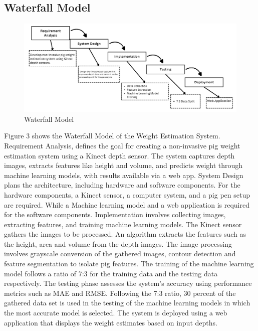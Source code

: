 {\subsection { Waterfall Model}
\begin{figure}[h]
	\centering
	\includegraphics[height=0.3\textheight]{figures/Requirement Analysis (4)}
	\caption{Waterfall Model}
	\label{fig:Waterfall Model}
\end{figure}

Figure 3 shows the Waterfall Model of the Weight Estimation System. Requirement Analysis, defines the goal for creating a non-invasive pig weight estimation system using a Kinect depth sensor. The system captures depth images, extracts features like height and volume, and predicts weight through machine learning models, with results available via a web app. System Design plans the architecture, including hardware and software components. For the hardware components, a Kinect sensor, a computer system, and a pig pen setup are required. While a Machine learning model and a web application is required for the software components. Implementation involves collecting images, extracting features, and training machine learning models. The Kinect sensor gathers the images to be processed. An algorithm extracts the features such as the height, area and volume from the depth images. The image processing involves grayscale conversion of the gathered images, contour detection and feature segmentation to isolate pig features. The training of the machine learning model follows a ratio of 7:3 for the training data and the testing data respectively. The testing phase assesses the system's accuracy using performance metrics such as MAE and RMSE. Following the 7:3 ratio, 30 percent of the gathered data set is used in the testing of the machine learning models in which the most accurate model is selected. The system is deployed using a web application that displays the weight estimates based on input depths.
\newpage
}
